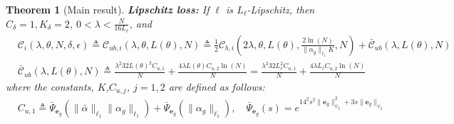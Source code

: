 \documentclass{article}
\def\rve{{\mathbf{e}}}
\newtheorem{theorem}{Theorem}[section]
\newcommand{\e}{\mathbf{e}}
\begin{document}
\begin{theorem}[Main result]
   \textbf{Lipschitz loss:}
     If  %
     $\ell$ is $L_{\ell}$-Lipschitz, then $C_{\delta}=1, K_{\delta}=2$, $0 <\lambda < \frac{N}{16L_{\ell}}$, and %
     \begin{equation*}
     \begin{aligned}
         & \mathcal{C}_i(\lambda,\theta,N,\delta,\epsilon) \triangleq  \mathcal{C}_{ub,i}(\lambda,\theta,L(\theta),N)
         \triangleq 
         \frac{1}{2} \mathcal{C}_{b,i}\left(2\lambda,\theta,L(\theta),\frac{2\ln(N)}{\|\alpha_g\|_{\ell_1}K},N\right) +
            \bar{\mathcal{C}}_{ub}(\lambda,L(\theta),N) \\
            &  \bar{\mathcal{C}}_{ub}(\lambda,L(\theta),N)  \triangleq \frac{\lambda^2 32 L(\theta)^2 C_{u,1}}{N}+ \frac{4\lambda L(\theta) C_{u,2} \ln(N)}{N}
            =
             \frac{\lambda^2 32 L^2_{\ell} C_{u,1}}{N}+ \frac{4\lambda L_{\ell} C_{u,2} \ln(N)}{N}
     \end{aligned}
    \end{equation*}
    where the constants, $K$,$C_{u,j}$, $j=1,2$ are  defined as follows:
    \begin{equation}
      \label{lipschitz:bound1}
     \begin{aligned}
        &  C_{u,1} \triangleq \bar{\Psi}_{\e_g}(\|\bar{\alpha}\|_{\ell_1}\|\alpha_g\|_{\ell_1})+\bar{\Psi}_{\e_g}(\|\alpha_g\|_{\ell_1}),  \quad \bar{\Psi}_{\rve_g}(s)=e^{14^2s^2 \|\rve_g\|_{\psi_2}^2+3s \|\rve_g\|_{\psi_2}} \\

\end{aligned}
\end{equation}
\end{theorem}
\end{document}
